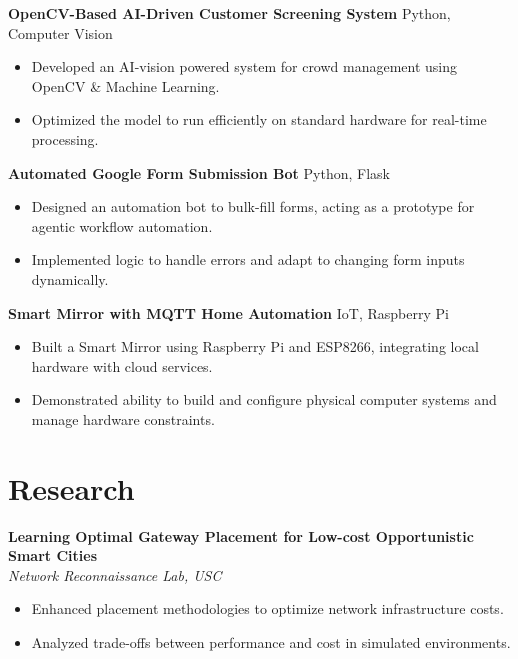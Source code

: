 \documentclass[letterpaper,10pt]{article}
\begin{document}
\textbf{OpenCV-Based AI-Driven Customer Screening System} \hfill Python, Computer Vision \\
\begin{itemize}
    \item Developed an AI-vision powered system for crowd management using OpenCV \& Machine Learning.
    \item Optimized the model to run efficiently on standard hardware for real-time processing.
\end{itemize}

\textbf{Automated Google Form Submission Bot} \hfill Python, Flask \\
\begin{itemize}
    \item Designed an automation bot to bulk-fill forms, acting as a prototype for agentic workflow automation.
    \item Implemented logic to handle errors and adapt to changing form inputs dynamically.
\end{itemize}



\textbf{Smart Mirror with MQTT Home Automation} \hfill IoT, Raspberry Pi \\
\begin{itemize}
    \item Built a Smart Mirror using Raspberry Pi and ESP8266, integrating local hardware with cloud services.
    \item Demonstrated ability to build and configure physical computer systems and manage hardware constraints.
\end{itemize}

\section*{Research}
\textbf{Learning Optimal Gateway Placement for Low-cost Opportunistic Smart Cities} \\
\textit{Network Reconnaissance Lab, USC}
\begin{itemize}
    \item Enhanced placement methodologies to optimize network infrastructure costs.
    \item Analyzed trade-offs between performance and cost in simulated environments.
\end{itemize}
\end{document}
